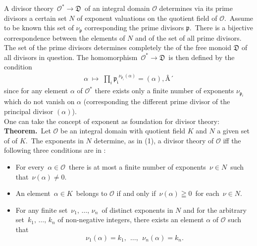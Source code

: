 \documentclass[12pt]{article}
\theoremstyle{definition}
\begin{document}
 

A divisor theory \,$\mathcal{O}^* \to \mathfrak{D}$\, of an integral domain $\mathcal{O}$ determines via its prime divisors a certain set $N$ of exponent valuations on the quotient field of $\mathcal{O}$.\, Assume to be known this set of  $\nu_{\mathfrak{p}}$ corresponding the prime divisors $\mathfrak{p}$.\, There is a bijective correspondence between the elements of $N$ and of the set of all prime divisors.\, The set of the prime divisors determines completely the  of the free monoid $\mathfrak{D}$ of all divisors in question.  The homomorphism \,$\mathcal{O}^* \to \mathfrak{D}$\, is then defined by the condition
\begin{align}
\alpha\; \mapsto\; \prod_i\mathfrak{p_i}^{\nu_{\mathfrak{p}_i}(\alpha)} = (\alpha),Â´
\end{align}
since for any element $\alpha$ of $\mathcal{O}^*$ there exists only a finite number of exponents $\nu_{\mathfrak{p}_i}$ which do not vanish on $\alpha$ (corresponding the different prime divisor  of the principal divisor $(\alpha)$).\\

One can take the concept of exponent as foundation for divisor theory:\\

\textbf{Theorem.}\, Let $\mathcal{O}$ be an integral domain with quotient field $K$ and $N$ a given set of  of $K$.\, The exponents in $N$ determine, as in (1), a divisor theory of $\mathcal{O}$ iff the following three conditions are in :
\begin{itemize}
\item For every\, $\alpha \in \mathcal{O}$\, there is at most a finite number of exponents\, $\nu \in N$\, such that\, $\nu(\alpha) \neq 0$.
\item An element\, $\alpha \in K$\, belongs to $\mathcal{O}$ if and only if\, $\nu(\alpha) \geqq 0$\, for each\, 
$\nu \in N$.
\item For any finite set \,$\nu_1,\,\ldots,\,\nu_n$\, of distinct exponents in $N$ and for the arbitrary set\, $k_1,\,\ldots,\,k_n$ of non-negative integers, there exists an element $\alpha$ of $\mathcal{O}$ such that
$$\nu_1(\alpha) = k_1,\,\;\ldots,\,\;\nu_n(\alpha) = k_n.$$
\end{itemize}
\end{document}
